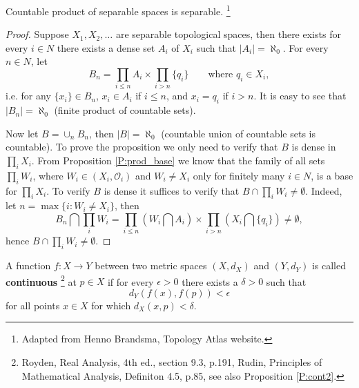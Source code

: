 \begin{proposition} \label{P:prod_sep}
Countable product of separable spaces is separable.
\footnote{Adapted from Henno Brandsma, Topology Atlas website.}
\end{proposition}
\begin{proof}
Suppose $X_1,X_2,\dots$ are separable topological spaces, then there exists
for every $i\in N$ there exists a dense set $A_i$ of $X_i$ such that
$|A_i|=\aleph_0$.
For every $n\in N$, let 
\[
  B_n = \prod_{i\leq n} A_i \times \prod_{i>n} \{q_i\}
      \qquad \text{where $q_i\in X_i$},
\]
i.e. for any $\{x_i\}\in B_n$, $x_i\in A_i$ if $i\leq n$, and $x_i = q_i$ 
if $i>n$. It is easy to see that $|B_n|=\aleph_0$ (finite product of 
countable sets).

Now let $B=\cup_n B_n$, then $|B|=\aleph_0$ (countable union of 
countable sets is countable). To prove the proposition we only need to 
verify that $B$ is dense in $\prod_i X_i$. From Proposition \ref{P:prod_base}
we know that the family of all sets $\prod_i W_i$, where 
$W_i\in (X_i,\mathcal{O}_i)$ and $W_i\neq X_i$ only for finitely many $i\in N$,
is a base for $\prod_i X_i$. To verify $B$ is dense it suffices to verify that
$B\cap \prod_i W_i\neq \emptyset$. Indeed, let $n=\max\{i: W_i\neq X_i\}$, then
\[
  B_n \bigcap \prod_i W_i = \prod_{i\leq n} \left( W_i \bigcap A_i \right)
                     \times \prod_{i>n} \left( X_i \bigcap \{q_i\} \right)
                          \neq \emptyset,
\]
hence $B\cap \prod_i W_i\neq\emptyset$.
\end{proof}

\begin{definition} \label{D:cont_metr}
A function $f:X\to Y$ between two metric spaces $(X,d_X)$ and $(Y,d_Y)$ is
called \textbf{continuous}
  \footnote{Royden, Real Analysis, 4th ed., section 9.3, p.191, Rudin,
     Principles of Mathematical Analysis, Definiton 4.5, p.85,
     see also Proposition \ref{P:cont2}.}
at $p\in X$ if for every $\epsilon>0$ there exists a $\delta>0$ such that
\[
	d_Y (f(x), f(p)) < \epsilon
\]
for all points $x\in X$ for which $d_X(x,p)<\delta$.
\end{definition}

